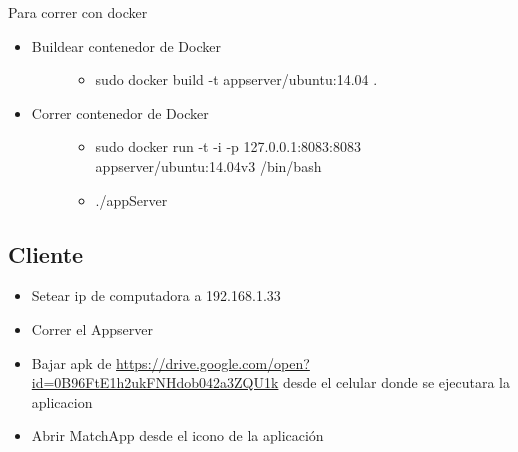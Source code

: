 \documentclass[letterpaper,10pt,english]{sphinxmanual}
\begin{document}
Para correr con docker
\begin{itemize}
\item {} \begin{description}
\item[{Buildear contenedor de Docker}] \leavevmode\begin{itemize}
\item {} 
sudo docker build -t appserver/ubuntu:14.04 .

\end{itemize}

\end{description}

\item {} \begin{description}
\item[{Correr contenedor de Docker}] \leavevmode\begin{itemize}
\item {} 
sudo docker run -t -i -p 127.0.0.1:8083:8083 appserver/ubuntu:14.04v3 /bin/bash

\item {} 
./appServer

\end{itemize}

\end{description}

\end{itemize}


\subsection{Cliente}
\label{manuals:cliente}\begin{itemize}
\item {} 
Setear ip de computadora a 192.168.1.33

\item {} 
Correr el Appserver

\item {} 
Bajar apk de \href{https://drive.google.com/open?id=0B96FtE1h2ukFNHdob042a3ZQU1k}{https://drive.google.com/open?id=0B96FtE1h2ukFNHdob042a3ZQU1k} desde el celular donde se ejecutara la aplicacion

\item {} 
Abrir MatchApp desde el icono de la aplicación

\end{itemize}
\end{document}
